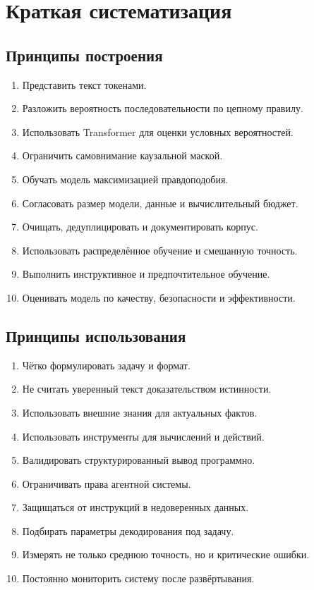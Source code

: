 \documentclass[12pt,a4paper]{article}
\newcommand{\1}{\mathbf{1}}
\theoremstyle{definition}
\theoremstyle{remark}
\begin{document}
\section{Краткая систематизация}

\subsection{Принципы построения}

\begin{enumerate}
    \item Представить текст токенами.
    \item Разложить вероятность последовательности по цепному правилу.
    \item Использовать Transformer для оценки условных вероятностей.
    \item Ограничить самовнимание каузальной маской.
    \item Обучать модель максимизацией правдоподобия.
    \item Согласовать размер модели, данные и вычислительный бюджет.
    \item Очищать, дедуплицировать и документировать корпус.
    \item Использовать распределённое обучение и смешанную точность.
    \item Выполнить инструктивное и предпочтительное обучение.
    \item Оценивать модель по качеству, безопасности и эффективности.
\end{enumerate}

\subsection{Принципы использования}

\begin{enumerate}
    \item Чётко формулировать задачу и формат.
    \item Не считать уверенный текст доказательством истинности.
    \item Использовать внешние знания для актуальных фактов.
    \item Использовать инструменты для вычислений и действий.
    \item Валидировать структурированный вывод программно.
    \item Ограничивать права агентной системы.
    \item Защищаться от инструкций в недоверенных данных.
    \item Подбирать параметры декодирования под задачу.
    \item Измерять не только среднюю точность, но и критические ошибки.
    \item Постоянно мониторить систему после развёртывания.
\end{enumerate}
\end{document}
